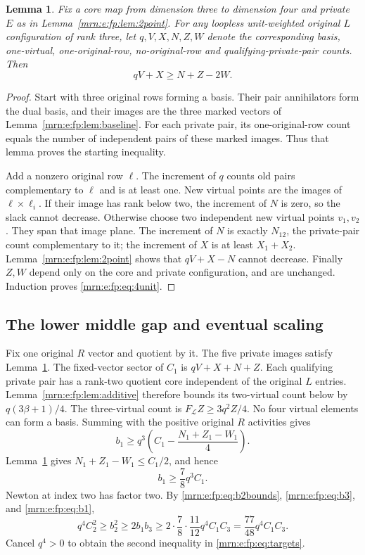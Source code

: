 \documentclass[11pt,a4paper]{article}
\newtheorem{lemma}[theorem]{Lemma}
\theoremstyle{remark}\newtheorem{remark}[theorem]{Remark}
\begin{document}
\begin{lemma}\label{mrn:e:fp:lem:4unit}
Fix a core map from dimension three to dimension four and private $E$ as in Lemma~\ref{mrn:e:fp:lem:2point}. For any loopless unit-weighted original $L$ configuration of rank three, let $q,V,X,N,Z,W$ denote the corresponding basis, one-virtual, one-original-row, no-original-row and qualifying-private-pair counts. Then
\begin{equation}\label{mrn:e:fp:eq:4unit}
 qV+X\ge N+Z-2W.
\end{equation}
\end{lemma}
\begin{proof}
Start with three original rows forming a basis. Their pair annihilators form the dual basis, and their images are the three marked vectors of Lemma~\ref{mrn:e:fp:lem:baseline}. For each private pair, its one-original-row count equals the number of independent pairs of these marked images. Thus that lemma proves the starting inequality.

Add a nonzero original row $\ell$. The increment of $q$ counts old pairs complementary to $\ell$ and is at least one. New virtual points are the images of $\ell\mathbin\times\ell_i$. If their image has rank below two, the increment of $N$ is zero, so the slack cannot decrease. Otherwise choose two independent new virtual points $v_1,v_2$. They span that image plane. The increment of $N$ is exactly $N_{12}$, the private-pair count complementary to it; the increment of $X$ is at least $X_1+X_2$. Lemma~\ref{mrn:e:fp:lem:2point} shows that $qV+X-N$ cannot decrease. Finally $Z,W$ depend only on the core and private configuration, and are unchanged. Induction proves \eqref{mrn:e:fp:eq:4unit}.
\end{proof}

\subsection{The lower middle gap and eventual scaling}
Fix one original $R$ vector and quotient by it. The five private images satisfy Lemma~\ref{mrn:e:fp:lem:4unit}. The fixed-vector sector of $C_1$ is $qV+X+N+Z$. Each qualifying private pair has a rank-two quotient core independent of the original $L$ entries. Lemma~\ref{mrn:e:fp:lem:additive} therefore bounds its two-virtual count below by $q(3\beta+1)/4$. The three-virtual count is $F_{\mathcal L}Z\ge3q^2Z/4$. No four virtual elements can form a basis. Summing with the positive original $R$ activities gives
\[
 b_1\ge q^3\left(C_1-\frac{N_1+Z_1-W_1}{4}\right).
\]
Lemma~\ref{mrn:e:fp:lem:4unit} gives $N_1+Z_1-W_1\le C_1/2$, and hence
\begin{equation}\label{mrn:e:fp:eq:b1}
 b_1\ge\frac78q^3C_1.
\end{equation}
Newton at index two has factor two. By \eqref{mrn:e:fp:eq:b2bounds}, \eqref{mrn:e:fp:eq:b3}, and \eqref{mrn:e:fp:eq:b1},
\[
 q^4C_2^2\ge b_2^2\ge2b_1b_3
 \ge2\cdot\frac78\cdot\frac{11}{12}q^4C_1C_3
 =\frac{77}{48}q^4C_1C_3.
\]
Cancel $q^4>0$ to obtain the second inequality in \eqref{mrn:e:fp:eq:targets}.
\end{document}
